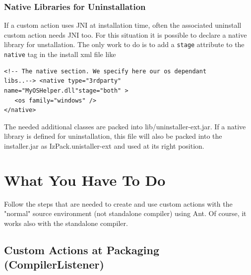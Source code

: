 \subsubsection{Native Libraries for Uninstallation}
If a custom action uses JNI at installation time, often the
associated uninstall custom action needs JNI too. For this
situation it is possible to declare a native library for
unstallation. The only work to do is to add a \texttt{stage}
attribute to the \texttt{native} tag in the install xml file like
\footnotesize
\begin{verbatim}
<!-- The native section. We specify here our os dependant
libs..--> <native type="3rdparty"
name="MyOSHelper.dll"stage="both" >
   <os family="windows" />
</native>
\end{verbatim}
\normalsize

The needed additional classes are packed into
lib/uninstaller-ext.jar. If a native library is defined for
uninstallation, this file will also be packed into the
installer.jar as IzPack.unistaller-ext and used at its right
position.


\section{What You Have To Do}
Follow the steps that are needed to create and use custom actions
with the "normal" source environment (not standalone compiler)
using Ant. Of course, it works also with the standalone compiler.

\subsection{\label{sec:caPackaging}Custom Actions at Packaging (CompilerListener)}

